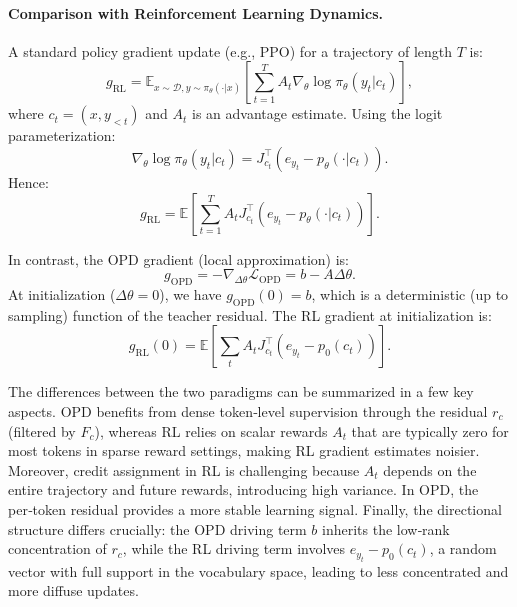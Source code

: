 \documentclass{article}
\begin{document}
\paragraph{Comparison with Reinforcement Learning Dynamics.}
A standard policy gradient update (e.g., PPO) for a trajectory of length \(T\) is:
\begin{equation}
g_{\mathrm{RL}} = \mathbb{E}_{x\sim\mathcal{D}, y\sim\pi_{\theta}(\cdot|x)}\left[ \sum_{t=1}^{T} A_t \nabla_\theta \log \pi_\theta(y_t|c_t) \right],
\end{equation}
where \(c_t = (x,y_{<t})\) and \(A_t\) is an advantage estimate. Using the logit parameterization:
\begin{equation}
\nabla_\theta \log \pi_\theta(y_t|c_t) = J_{c_t}^{\top} (e_{y_t} - p_\theta(\cdot|c_t)).
\end{equation}
Hence:
\begin{equation}
g_{\mathrm{RL}} = \mathbb{E}\left[ \sum_{t=1}^{T} A_t J_{c_t}^{\top} (e_{y_t} - p_\theta(\cdot|c_t)) \right].
\end{equation}

In contrast, the OPD gradient (local approximation) is:
\begin{equation}
g_{\mathrm{OPD}} = -\nabla_{\Delta\theta}\mathcal{L}_{\mathrm{OPD}} = b - A\Delta\theta.
\end{equation}
At initialization (\(\Delta\theta=0\)), we have \(g_{\mathrm{OPD}}(0) = b\), which is a deterministic (up to sampling) function of the teacher residual. The RL gradient at initialization is:
\begin{equation}
g_{\mathrm{RL}}(0) = \mathbb{E}\left[ \sum_{t} A_t J_{c_t}^{\top} (e_{y_t} - p_0(c_t)) \right].
\end{equation}

The differences between the two paradigms can be summarized in a few key aspects. OPD benefits from dense token‑level supervision through the residual \(r_c\) (filtered by \(F_c\)), whereas RL relies on scalar rewards \(A_t\) that are typically zero for most tokens in sparse reward settings, making RL gradient estimates noisier. Moreover, credit assignment in RL is challenging because \(A_t\) depends on the entire trajectory and future rewards, introducing high variance. In OPD, the per‑token residual provides a more stable learning signal. Finally, the directional structure differs crucially: the OPD driving term \(b\) inherits the low‑rank concentration of \(r_c\), while the RL driving term involves \(e_{y_t} - p_0(c_t)\), a random vector with full support in the vocabulary space, leading to less concentrated and more diffuse updates.
\end{document}
